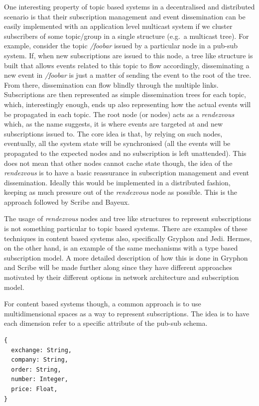 One interesting property of topic based systems in a decentralised and
distributed scenario is that their subscription management and event
dissemination can be easily implemented with an application level
multicast system if we cluster subscribers of some topic/group in a
single structure (e.g.~a multicast tree). For example, consider the
topic \emph{/foobar} issued by a particular node in a pub-sub system.
If, when new subscriptions are issued to this node, a tree like
structure is built that allows events related to this topic to flow
accordingly, disseminating a new event in \emph{/foobar} is just a
matter of sending the event to the root of the tree. From there,
dissemination can flow blindly through the multiple links. Subscriptions
are then represented as simple dissemination trees for each topic,
which, interestingly enough, ends up also representing how the actual
events will be propagated in each topic. The root node (or nodes) acts
as a \emph{rendezvous} which, as the name suggests, it is where events
are targeted at and new subscriptions issued to. The core idea is that,
by relying on such nodes, eventually, all the system state will be
synchronised (all the events will be propagated to the expected nodes
and no subscription is left unattended). This does not mean that other
nodes cannot cache state though, the idea of the \emph{rendezvous} is to
have a basic reassurance in subscription management and event
dissemination. Ideally this would be implemented in a distributed
fashion, keeping as much pressure out of the \emph{rendezvous} node as
possible. This is the approach followed by Scribe and Bayeux.

The usage of \emph{rendezvous} nodes and tree like structures to
represent subscriptions is not something particular to topic based
systems. There are examples of these techniques in content based systems
also, specifically Gryphon and Jedi. Hermes, on the other hand, is
an example of the same mechanisms with a type based subscription model.
A more detailed description of how this is done in Gryphon and Scribe
will be made further along since they have different approaches
motivated by their different options in network architecture and
subscription model.

For content based systems though, a common approach is to use
multidimensional spaces as a way to represent subscriptions. The idea is
to have each dimension refer to a specific attribute of the pub-sub
schema.

\begin{verbatim}
{
  exchange: String,
  company: String,
  order: String,
  number: Integer,
  price: Float,
}
\end{verbatim}

